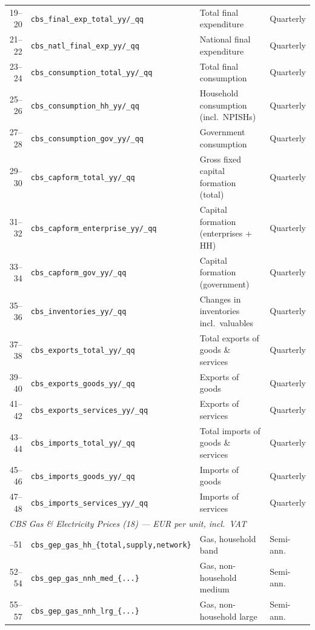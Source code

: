 \begin{table}[htbp]
\begin{tabularx}{\columnwidth}{r l X l}
19--20 & \texttt{cbs\_final\_exp\_total\_yy/\_qq} & Total final expenditure & Quarterly \\
21--22 & \texttt{cbs\_natl\_final\_exp\_yy/\_qq}  & National final expenditure & Quarterly \\
23--24 & \texttt{cbs\_consumption\_total\_yy/\_qq} & Total final consumption & Quarterly \\
25--26 & \texttt{cbs\_consumption\_hh\_yy/\_qq}  & Household consumption (incl.\ NPISHs) & Quarterly \\
27--28 & \texttt{cbs\_consumption\_gov\_yy/\_qq} & Government consumption & Quarterly \\
29--30 & \texttt{cbs\_capform\_total\_yy/\_qq}   & Gross fixed capital formation (total) & Quarterly \\
31--32 & \texttt{cbs\_capform\_enterprise\_yy/\_qq} & Capital formation (enterprises + HH) & Quarterly \\
33--34 & \texttt{cbs\_capform\_gov\_yy/\_qq}     & Capital formation (government) & Quarterly \\
35--36 & \texttt{cbs\_inventories\_yy/\_qq}      & Changes in inventories incl.\ valuables & Quarterly \\
37--38 & \texttt{cbs\_exports\_total\_yy/\_qq}   & Total exports of goods \& services & Quarterly \\
39--40 & \texttt{cbs\_exports\_goods\_yy/\_qq}   & Exports of goods & Quarterly \\
41--42 & \texttt{cbs\_exports\_services\_yy/\_qq} & Exports of services & Quarterly \\
43--44 & \texttt{cbs\_imports\_total\_yy/\_qq}   & Total imports of goods \& services & Quarterly \\
45--46 & \texttt{cbs\_imports\_goods\_yy/\_qq}   & Imports of goods & Quarterly \\
47--48 & \texttt{cbs\_imports\_services\_yy/\_qq} & Imports of services & Quarterly \\
\midrule
\multicolumn{4}{l}{\textit{CBS Gas \& Electricity Prices (18) --- EUR per unit, incl.\ VAT}} \\
\addlinespace[2pt]
49--51 & \texttt{cbs\_gep\_gas\_hh\_\{total,supply,network\}}     & Gas, household band & Semi-ann. \\
52--54 & \texttt{cbs\_gep\_gas\_nnh\_med\_\{...\}}  & Gas, non-household medium & Semi-ann. \\
55--57 & \texttt{cbs\_gep\_gas\_nnh\_lrg\_\{...\}}  & Gas, non-household large & Semi-ann. \\

\end{tabularx}
\end{table}
